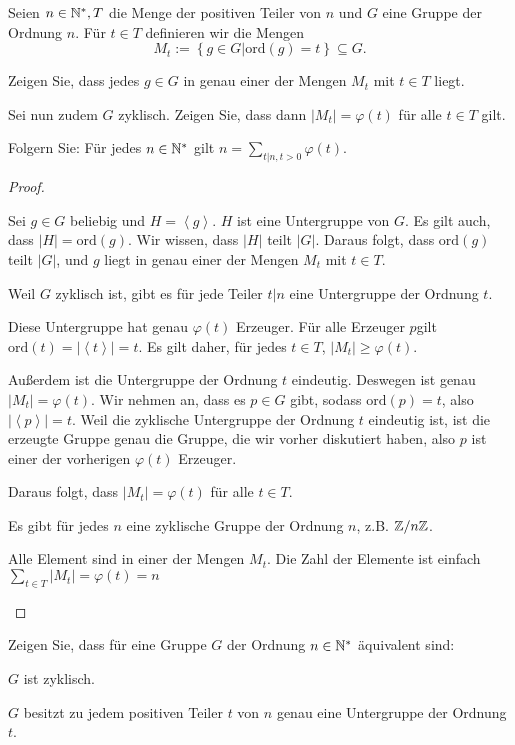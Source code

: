 \begin{Problem}
	Seien $n\in \mathbb{N}^*, T$ die Menge der positiven Teiler von $n$ und $G$ eine Gruppe der Ordnung $n$. F\"{u}r $t\in T$ definieren wir die Mengen
	\[
		M_t:=\left\{ g\in G|\text{ord}(g)=t \right\} \subseteq G
	.\] 
	\begin{parts}
		\item Zeigen Sie, dass jedes $g\in G$ in genau einer der Mengen $M_t$ mit $t\in T$ liegt.
		\item Sei nun zudem $G$ zyklisch. Zeigen Sie, dass dann $|M_t|=\varphi(t)$ f\"{u}r alle $t\in T$ gilt.
		\item Folgern Sie: F\"{u}r jedes $n\in \mathbb{N}^*$ gilt $n=\sum_{t|n, t>0}\varphi(t)$.
	\end{parts}
\end{Problem}
\begin{proof}
	\begin{parts}
	\item Sei $g\in G$ beliebig und $H=\left<g \right>$. $H$ ist eine Untergruppe von $G$. Es gilt auch, dass $|H|=\text{ord}(g)$. Wir wissen, dass $|H|$ teilt $|G|$. Daraus folgt, dass $\text{ord}(g)$ teilt $|G|$, und $g$ liegt in genau einer der Mengen $M_t$ mit $t\in T$.
	\item Weil $G$ zyklisch ist, gibt es f\"{u}r jede Teiler $t|n$ eine Untergruppe der Ordnung $t$. 

		Diese Untergruppe hat genau $\varphi(t)$ Erzeuger. F\"{u}r alle Erzeuger $p$gilt $\text{ord}(t)=|\left<t \right>|=t$. Es gilt daher, f\"{u}r jedes $t\in T$, $|M_t|\ge \varphi(t)$. 

		Außerdem ist die Untergruppe der Ordnung $t$ eindeutig. Deswegen ist genau $|M_t|=\varphi(t)$. Wir nehmen an, dass es $p\in G$ gibt, sodass $\text{ord}(p)=t$, also $|\left<p \right>|=t$. Weil die zyklische Untergruppe der Ordnung $t$ eindeutig ist, ist die erzeugte Gruppe genau die Gruppe, die wir vorher diskutiert haben, also $p$ ist einer der vorherigen $\varphi(t)$ Erzeuger.

		Daraus folgt, dass $|M_t|=\varphi(t)$ f\"{u}r alle $t\in T$.
	\item Es gibt f\"{u}r jedes $n$ eine zyklische Gruppe der Ordnung $n$, z.B. $\mathbb{Z} / n\mathbb{Z}$.

		Alle Element sind in einer der Mengen $M_t$. Die Zahl der Elemente ist einfach  $\sum_{t\in T} |M_t|=\varphi(t)=n$
	\end{parts}
\end{proof}
\begin{Problem}
	Zeigen Sie, dass für eine Gruppe $G$ der Ordnung $n \in \mathbb{N}^*$ äquivalent sind:
	\begin{parts}
	\item $G$ ist zyklisch.
	\item $G$ besitzt zu jedem positiven Teiler $t$ von $n$ genau eine Untergruppe der Ordnung $t$.
	\end{parts}
\end{Problem}
